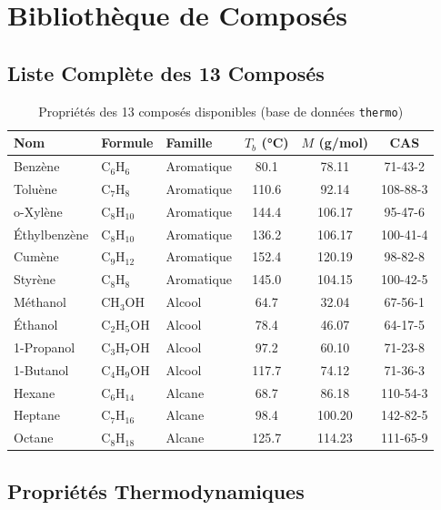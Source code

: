 \documentclass[11pt,a4paper]{article}
\begin{document}
\section{Bibliothèque de Composés}

\subsection{Liste Complète des 13 Composés}

\begin{table}[h]
\centering
\small
\begin{tabular}{lllccc}
\toprule
\textbf{Nom} & \textbf{Formule} & \textbf{Famille} & \textbf{$T_b$ (°C)} & \textbf{$M$ (g/mol)} & \textbf{CAS} \\
\midrule
Benzène & C$_6$H$_6$ & Aromatique & 80.1 & 78.11 & 71-43-2 \\
Toluène & C$_7$H$_8$ & Aromatique & 110.6 & 92.14 & 108-88-3 \\
o-Xylène & C$_8$H$_{10}$ & Aromatique & 144.4 & 106.17 & 95-47-6 \\
Éthylbenzène & C$_8$H$_{10}$ & Aromatique & 136.2 & 106.17 & 100-41-4 \\
Cumène & C$_9$H$_{12}$ & Aromatique & 152.4 & 120.19 & 98-82-8 \\
Styrène & C$_8$H$_8$ & Aromatique & 145.0 & 104.15 & 100-42-5 \\
\midrule
Méthanol & CH$_3$OH & Alcool & 64.7 & 32.04 & 67-56-1 \\
Éthanol & C$_2$H$_5$OH & Alcool & 78.4 & 46.07 & 64-17-5 \\
1-Propanol & C$_3$H$_7$OH & Alcool & 97.2 & 60.10 & 71-23-8 \\
1-Butanol & C$_4$H$_9$OH & Alcool & 117.7 & 74.12 & 71-36-3 \\
\midrule
Hexane & C$_6$H$_{14}$ & Alcane & 68.7 & 86.18 & 110-54-3 \\
Heptane & C$_7$H$_{16}$ & Alcane & 98.4 & 100.20 & 142-82-5 \\
Octane & C$_8$H$_{18}$ & Alcane & 125.7 & 114.23 & 111-65-9 \\
\bottomrule
\end{tabular}
\caption{Propriétés des 13 composés disponibles (base de données \texttt{thermo})}
\end{table}

\subsection{Propriétés Thermodynamiques}
\end{document}
